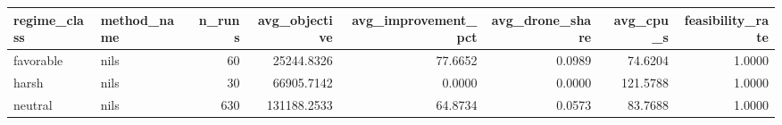 \begin{tabular}{llrrrrrr}
\toprule
regime_class & method_name & n_runs & avg_objective & avg_improvement_pct & avg_drone_share & avg_cpu_s & feasibility_rate \\
\midrule
favorable & nils & 60 & 25244.8326 & 77.6652 & 0.0989 & 74.6204 & 1.0000 \\
harsh & nils & 30 & 66905.7142 & 0.0000 & 0.0000 & 121.5788 & 1.0000 \\
neutral & nils & 630 & 131188.2533 & 64.8734 & 0.0573 & 83.7688 & 1.0000 \\
\bottomrule
\end{tabular}
